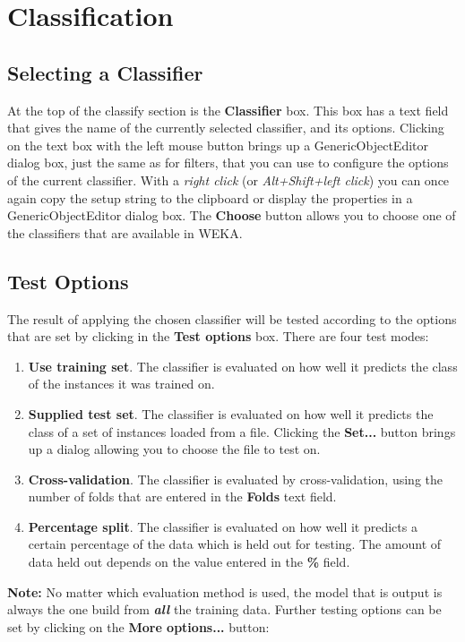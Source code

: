 \documentclass[a4paper]{article}
\begin{document}
\newpage

\section{Classification}

\begin{center}
\end{center}

\subsection{Selecting a Classifier}

\label{sec:classifier}
At the top of the classify section is the \textbf{Classifier}
box. This box has a text field that gives the name of the currently
selected classifier, and its options. Clicking on the text box with 
the left mouse button brings up a GenericObjectEditor dialog box, 
just the same as for filters, that you can use to configure the options 
of the current classifier. With a \textit{right click} (or 
\textit{Alt+Shift+left click}) you can once again copy 
the setup string to the clipboard or display the properties in a 
GenericObjectEditor dialog box.
The \textbf{Choose} button allows you to choose one of the classifiers
that are available in WEKA.

\subsection{Test Options}

The result of applying the chosen classifier will be tested according to the
options that are set by clicking in the \textbf{Test options} box.  There are
four test modes:

\begin{enumerate}
\item \textbf{Use training set}.
The classifier is evaluated on how well it predicts the class of the instances
it was trained on. 
\item \textbf{Supplied test set}.
The classifier is evaluated on how well it predicts the class of a set of
instances loaded from a file. Clicking the \textbf{Set...} button brings up a
dialog allowing you to choose the file to test on.
\item \textbf{Cross-validation}.
The classifier is evaluated by cross-validation, using the number of folds that
are entered in the \textbf{Folds} text field. 
\item \textbf{Percentage split}.
The classifier is evaluated on how well it predicts a certain percentage of the
data which is held out for testing. The amount of data held out depends on the
value entered in the \textbf{\%} field.
\end{enumerate}
\noindent
\textbf{Note:} No matter which evaluation method is used, the model
that is output is always the one build from \textbf{\em all} the training data.
\noindent
Further testing options can be set by clicking on the \textbf{More options...}
button:
\end{document}
